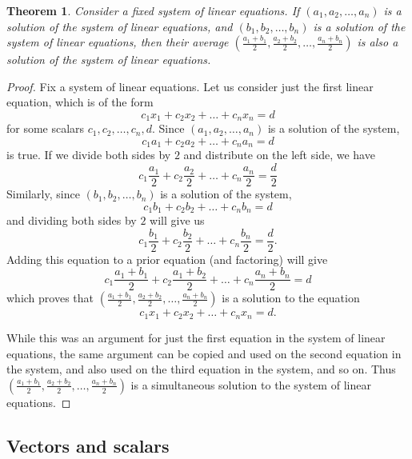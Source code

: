 \documentclass{book}
\newcounter{ekcounter}%
\theoremstyle{ekimcustom}
\newtheorem{theorem}[ekcounter]{Theorem}
\begin{document}
\begin{theorem}
Consider a fixed system of linear equations. If $(a_1,a_2,\dots,a_n)$ is a solution of the system of linear equations, and $(b_1,b_2,\dots,b_n)$ is a solution of the system of linear equations, then their average $(\frac{a_1+b_1}{2},\frac{a_2+b_2}{2},\dots,\frac{a_n+b_n}{2})$ is also a solution of the system of linear equations.
\end{theorem}
\begin{proof}
Fix a system of linear equations. Let us consider just the first linear equation, which is of the form
\[ c_1x_1 + c_2x_2 + \dots + c_nx_n = d\]
for some scalars $c_1,c_2,\dots,c_n,d$. Since $(a_1,a_2,\dots,a_n)$ is a solution of the system,
\[ c_1a_1 + c_2a_2 + \dots + c_na_n = d\]
is true. If we divide both sides by $2$ and distribute on the left side, we have
\[ c_1\frac{a_1}{2} + c_2\frac{a_2}{2} + \dots + c_n\frac{a_n}{2} = \frac{d}{2}\]
Similarly, since $(b_1,b_2,\dots,b_n)$ is a solution of the system,
\[ c_1b_1 + c_2b_2 + \dots + c_nb_n = d\]
and dividing both sides by $2$ will give us
\[ c_1\frac{b_1}{2} + c_2\frac{b_2}{2} + \dots + c_n\frac{b_n}{2} = \frac{d}{2}.\]
Adding this equation to a prior equation (and factoring) will give
\[ c_1\frac{a_1+b_1}{2} + c_2\frac{a_1+b_2}{2} + \dots + c_n\frac{a_n+b_n}{2} = d\]
which proves that $(\frac{a_1+b_1}{2},\frac{a_2+b_2}{2},\dots,\frac{a_n+b_n}{2})$ is a solution to the equation
\[ c_1x_1 + c_2x_2 + \dots + c_nx_n = d.\]

While this was an argument for just the first equation in the system of linear equations, the same argument can be copied and used on the second equation in the system, and also used on the third equation in the system, and so on. Thus $(\frac{a_1+b_1}{2},\frac{a_2+b_2}{2},\dots,\frac{a_n+b_n}{2})$ is a simultaneous solution to the system of linear equations.
\end{proof}

\subsection{Vectors and scalars}
\end{document}
